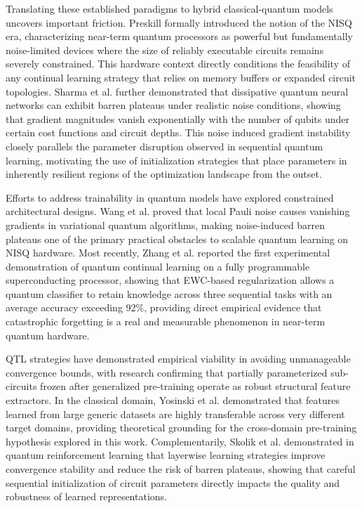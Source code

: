 \documentclass[conference]{IEEEtran}
\begin{document}
Translating these established paradigms to hybrid classical-quantum models uncovers important friction. Preskill \cite{Preskill18} formally introduced the notion of the NISQ era, characterizing near-term quantum processors as powerful but fundamentally noise-limited devices where the size of reliably executable circuits remains severely constrained. This hardware context directly conditions the feasibility of any continual learning strategy that relies on memory buffers or expanded circuit topologies. Sharma et al. \cite{Sharma22} further demonstrated that dissipative quantum neural networks can exhibit barren plateaus under realistic noise conditions, showing that gradient magnitudes vanish exponentially with the number of qubits under certain cost functions and circuit depths. This noise induced gradient instability closely parallels the parameter disruption observed in sequential quantum learning, motivating the use of initialization strategies that place parameters in inherently resilient regions of the optimization landscape from the outset.


Efforts to address trainability in quantum models have explored constrained architectural designs. Wang et al. \cite{Wang21} proved that local Pauli noise causes vanishing gradients in variational quantum algorithms, making noise-induced barren plateaus one of the primary practical obstacles to scalable quantum learning on NISQ hardware. Most recently, Zhang et al. \cite{Zhang26} reported the first experimental demonstration of quantum continual learning on a fully programmable superconducting processor, showing that EWC-based regularization allows a quantum classifier to retain knowledge across three sequential tasks with an average accuracy exceeding 92\%, providing direct empirical evidence that catastrophic forgetting is a real and measurable phenomenon in near-term quantum hardware.

QTL strategies have demonstrated empirical viability in avoiding unmanageable convergence bounds, with research confirming that partially parameterized sub-circuits frozen after generalized pre-training operate as robust structural feature extractors. In the classical domain, Yosinski et al. \cite{Yosinski14} demonstrated that features learned from large generic datasets are highly transferable across very different target domains, providing theoretical grounding for the cross-domain pre-training hypothesis explored in this work. Complementarily, Skolik et al. \cite{Skolik21} demonstrated in quantum reinforcement learning that layerwise learning strategies improve convergence stability and reduce the risk of barren plateaus, showing that careful sequential initialization of circuit parameters directly impacts the quality and robustness of learned representations.
\end{document}
